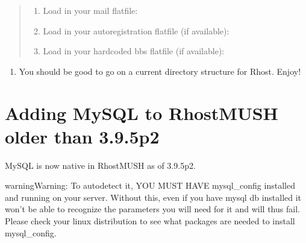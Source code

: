 \documentclass[letterpaper,10pt,english]{sphinxmanual}
\begin{document}
\begin{quote}
\begin{enumerate}
\end{enumerate}
\begin{enumerate}
%
\item {} 
\sphinxAtStartPar
Load in your mail flatfile:

\begin{sphinxVerbatim}[commandchars=\\\{\}]
\end{sphinxVerbatim}

\item {} 
\sphinxAtStartPar
Load in your autoregistration flatfile (if available):

\begin{sphinxVerbatim}[commandchars=\\\{\}]
\end{sphinxVerbatim}

\item {} 
\sphinxAtStartPar
Load in your hardcoded bbs flatfile (if available):

\begin{sphinxVerbatim}[commandchars=\\\{\}]
\end{sphinxVerbatim}

\end{enumerate}
\end{quote}
\begin{enumerate}
%
\setcounter{enumi}{8}
\item {} 
\sphinxAtStartPar
You should be good to go on a current directory structure for Rhost.  Enjoy!

\end{enumerate}


\section{Adding MySQL to RhostMUSH older than 3.9.5p2}
\label{\detokenize{legacy:adding-mysql-to-rhostmush-older-than-3-9-5p2}}
\sphinxAtStartPar
MySQL is now native in RhostMUSH as of 3.9.5p2.

\begin{sphinxadmonition}{warning}{Warning:}
\sphinxAtStartPar
To autodetect it, YOU MUST HAVE mysql\_config installed and running on your server.  Without this, even if you have mysql db installed it won’t be able to recognize the parameters you will need for it and will thus fail.  Please check your linux distribution to see what packages are needed to install mysql\_config.
\end{sphinxadmonition}
\end{document}
